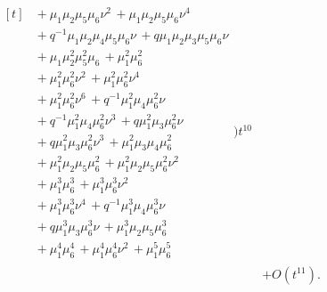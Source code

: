 \documentclass[10pt]{article}
\begin{document}
\[\begin{aligned}
\begin{aligned}[t]
  &{}+\mu_1\mu_2\mu_5\mu_6\nu^{2}\,+\mu_1\mu_2\mu_5\mu_6\nu^{4} \\
  &{}+q^{-1}\mu_1\mu_2\mu_4\mu_5\mu_6\nu\,+q\mu_1\mu_2\mu_3\mu_5\mu_6\nu \\
  &{}+\mu_1\mu_2^{2}\mu_5^{2}\mu_6\,+\mu_1^{2}\mu_6^{2} \\
  &{}+\mu_1^{2}\mu_6^{2}\nu^{2}\,+\mu_1^{2}\mu_6^{2}\nu^{4} \\
  &{}+\mu_1^{2}\mu_6^{2}\nu^{6}\,+q^{-1}\mu_1^{2}\mu_4\mu_6^{2}\nu \\
  &{}+q^{-1}\mu_1^{2}\mu_4\mu_6^{2}\nu^{3}\,+q\mu_1^{2}\mu_3\mu_6^{2}\nu \\
  &{}+q\mu_1^{2}\mu_3\mu_6^{2}\nu^{3}\,+\mu_1^{2}\mu_3\mu_4\mu_6^{2} \\
  &{}+\mu_1^{2}\mu_2\mu_5\mu_6^{2}\,+\mu_1^{2}\mu_2\mu_5\mu_6^{2}\nu^{2} \\
  &{}+\mu_1^{3}\mu_6^{3}\,+\mu_1^{3}\mu_6^{3}\nu^{2} \\
  &{}+\mu_1^{3}\mu_6^{3}\nu^{4}\,+q^{-1}\mu_1^{3}\mu_4\mu_6^{3}\nu \\
  &{}+q\mu_1^{3}\mu_3\mu_6^{3}\nu\,+\mu_1^{3}\mu_2\mu_5\mu_6^{3} \\
  &{}+\mu_1^{4}\mu_6^{4}\,+\mu_1^{4}\mu_6^{4}\nu^{2}\,+\mu_1^{5}\mu_6^{5}\end{aligned}\Bigr)t^{10} \\
  &+ O(t^{11}).
\end{aligned}
\]
\end{document}
